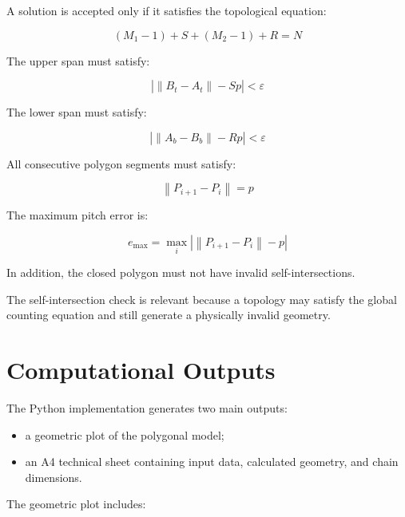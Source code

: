 \documentclass[12pt,a4paper]{article}
\begin{document}
A solution is accepted only if it satisfies the topological equation:

\begin{equation}
(M_1-1)+S+(M_2-1)+R=N
\end{equation}

The upper span must satisfy:

\begin{equation}
\left|
\left\lVert B_t-A_t \right\rVert
-
Sp
\right|
<
\varepsilon
\end{equation}

The lower span must satisfy:

\begin{equation}
\left|
\left\lVert A_b-B_b \right\rVert
-
Rp
\right|
<
\varepsilon
\end{equation}

All consecutive polygon segments must satisfy:

\begin{equation}
\left\lVert P_{i+1}-P_i \right\rVert=p
\end{equation}

The maximum pitch error is:

\begin{equation}
e_{\max}
=
\max_i
\left|
\left\lVert P_{i+1}-P_i \right\rVert
-
p
\right|
\end{equation}

In addition, the closed polygon must not have invalid self-intersections.

The self-intersection check is relevant because a topology may satisfy the global counting equation and still generate a physically invalid geometry.

\section{Computational Outputs}

The Python implementation generates two main outputs:

\begin{itemize}
    \item a geometric plot of the polygonal model;
    \item an A4 technical sheet containing input data, calculated geometry, and chain dimensions.
\end{itemize}

The geometric plot includes:
\end{document}
